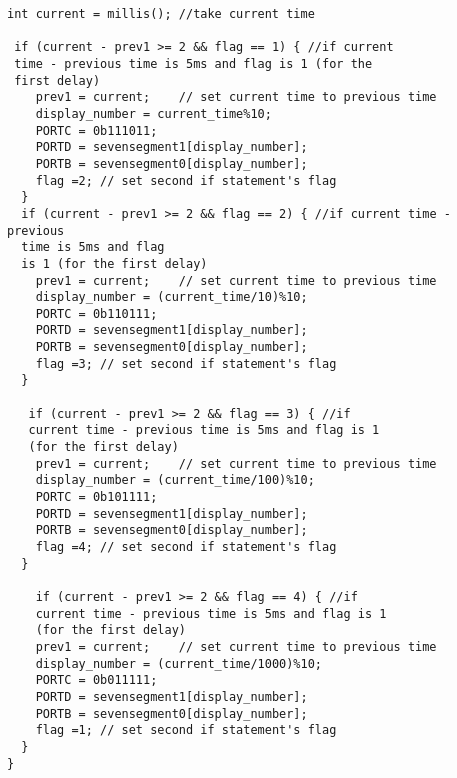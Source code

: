 \documentclass[pdftex,12pt,a4paper]{article}
\begin{document}
\begin{flushleft}
\begin{lstlisting}[language=Arduino]
 int current = millis(); //take current time
  
 if (current - prev1 >= 2 && flag == 1) { //if current 
 time - previous time is 5ms and flag is 1 (for the 
 first delay)
    prev1 = current;	// set current time to previous time
  	display_number = current_time%10;
  	PORTC = 0b111011;
  	PORTD = sevensegment1[display_number];
  	PORTB = sevensegment0[display_number];
    flag =2; // set second if statement's flag
  }
  if (current - prev1 >= 2 && flag == 2) { //if current time - previous 
  time is 5ms and flag 
  is 1 (for the first delay)
    prev1 = current;	// set current time to previous time
	display_number = (current_time/10)%10;
  	PORTC = 0b110111;
  	PORTD = sevensegment1[display_number];
  	PORTB = sevensegment0[display_number];
    flag =3; // set second if statement's flag
  } 
  
   if (current - prev1 >= 2 && flag == 3) { //if 
   current time - previous time is 5ms and flag is 1 
   (for the first delay)
    prev1 = current;	// set current time to previous time
  	display_number = (current_time/100)%10;
  	PORTC = 0b101111;
  	PORTD = sevensegment1[display_number];
  	PORTB = sevensegment0[display_number];
    flag =4; // set second if statement's flag
  } 
  
    if (current - prev1 >= 2 && flag == 4) { //if 
    current time - previous time is 5ms and flag is 1 
    (for the first delay)
    prev1 = current;	// set current time to previous time
  	display_number = (current_time/1000)%10;
  	PORTC = 0b011111;
  	PORTD = sevensegment1[display_number];
  	PORTB = sevensegment0[display_number];
    flag =1; // set second if statement's flag
  } 
}
\end{lstlisting}
\end{flushleft}
\end{document}
